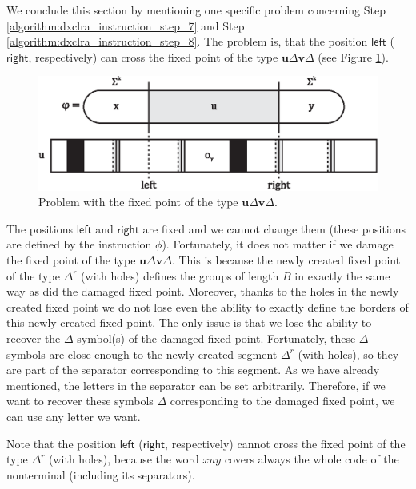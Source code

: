 We conclude this section by mentioning one specific problem concerning Step \ref{algorithm:dxclra_instruction_step_7} and Step \ref{algorithm:dxclra_instruction_step_8}. The problem is, that the position $\textsf{left}$ ($\textsf{right}$, respectively) can cross the fixed point of the type $\mathbf{u} \Delta \mathbf{v} \Delta$ (see Figure \ref{figure:delete_issue}).

\begin{figure}[htp]
\centering
\includegraphics[scale=1.0]{delete_issue.eps}
\caption[Problem with the fixed point of the type $\mathbf{u} \Delta \mathbf{v} \Delta$.]
{Problem with the fixed point of the type $\mathbf{u} \Delta \mathbf{v} \Delta$.}
\label{figure:delete_issue}
\end{figure}

The positions $\textsf{left}$ and $\textsf{right}$ are fixed and we cannot change them (these positions are defined by the instruction $\phi$). Fortunately, it does not matter if we damage the fixed point of the type $\mathbf{u} \Delta \mathbf{v} \Delta$. This is because the newly created fixed point of the type $\Delta^r$ (with holes) defines the groups of length $B$ in exactly the same way as did the damaged fixed point. Moreover, thanks to the holes in the newly created fixed point we do not lose even the ability to exactly define the borders of this newly created fixed point. The only issue is that we lose the ability to recover the $\Delta$ symbol(s) of the damaged fixed point. Fortunately, these $\Delta$ symbols are close enough to the newly created segment $\Delta^r$ (with holes), so they are part of the separator corresponding to this segment. As we have already mentioned, the letters in the separator can be set arbitrarily. Therefore, if we want to recover these symbols $\Delta$ corresponding to the damaged fixed point, we can use any letter we want.

Note that the position $\textsf{left}$ ($\textsf{right}$, respectively) cannot cross the fixed point of the type $\Delta^r$ (with holes), because  the word $xuy$ covers always the whole code of the nonterminal  (including its separators).

